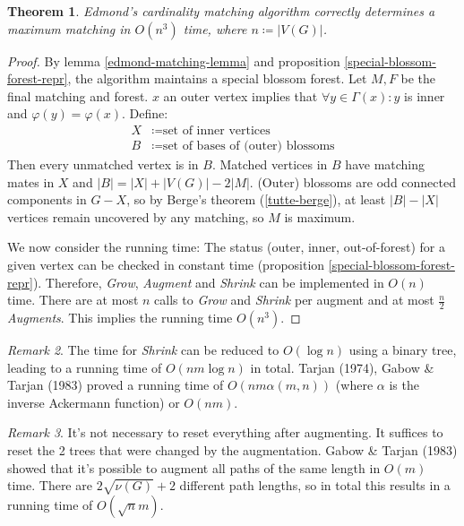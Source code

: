 \documentclass[11pt, a4paper]{article}
\newcommand{\abs}[1]{\left\lvert#1\right\rvert}
\newtheorem{theorem}{Theorem}[section]
\theoremstyle{remark}
\newtheorem{remark}[theorem]{Remark}
\theoremstyle{definition}
\begin{document}
\begin{theorem}\label{thm:edmonds-matching-alg}
	Edmond's cardinality matching algorithm correctly determines a maximum
	matching in $O(n^3)$ time, where $n\coloneqq\abs{V(G)}$.
\end{theorem}
\begin{proof}
	By lemma \ref{edmond-matching-lemma} and proposition
	\ref{special-blossom-forest-repr}, the algorithm maintains a special
	blossom forest. Let $M,F$ be the final matching and forest. $x$ an outer
	vertex implies that $\forall y\in\Gamma(x): y$ is inner and $\varphi(y)=\varphi(x)$.
	Define:
	\begin{align*}
		X & \coloneqq \text{set of inner vertices}            \\
		B & \coloneqq \text{set of bases of (outer) blossoms}
	\end{align*}
	Then every unmatched vertex is in $B$. Matched vertices in $B$ have
	matching mates in $X$ and $\abs{B}=\abs{X}+\abs{V(G)}-2\abs{M}$. (Outer)
	blossoms are odd connected components in $G-X$, so by Berge's theorem
	(\ref{tutte-berge}), at least $\abs{B}-\abs{X}$ vertices remain uncovered
	by any matching, so $M$ is maximum.

	We now consider the running time: The status (outer, inner,
	out-of-forest) for a given vertex can be checked in constant time
	(proposition \ref{special-blossom-forest-repr}). Therefore,
	\emph{Grow}, \emph{Augment} and \emph{Shrink} can be implemented in
	$O(n)$ time. There are at most $n$ calls to \emph{Grow} and
	\emph{Shrink} per augment and at most $\frac{n}{2}$ \emph{Augments}.
	This implies the running time $O(n^3)$.
\end{proof}

\begin{remark}
	The time for \emph{Shrink} can be reduced to $O(\log n)$ using a binary
	tree, leading to a running time of $O(nm\log n)$ in total. Tarjan (1974),
	Gabow \& Tarjan (1983) proved a running time of $O(nm\alpha(m,n))$ (where
	$\alpha$ is the inverse Ackermann function) or $O(nm)$.
\end{remark}

\begin{remark}
	It's not necessary to reset everything after augmenting. It suffices to
	reset the 2 trees that were changed by the augmentation. Gabow \& Tarjan
	(1983) showed that it's possible to augment all paths of the same length in
	$O(m)$ time. There are $2\sqrt{\nu(G)}+2$ different path lengths, so
	in total this results in a running time of $O(\sqrt{n}m)$.
\end{remark}
\end{document}
